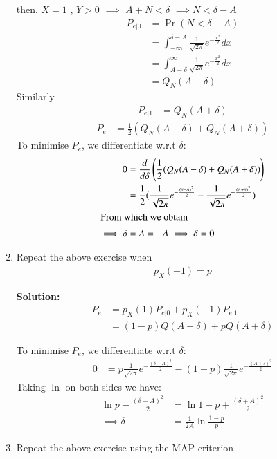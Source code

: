 \documentclass[journal,12pt,twocolumn]{IEEEtran}
\newcommand{\solution}{\noindent \textbf{Solution: }}
\providecommand{\pr}[1]{\ensuremath{\Pr\left(#1\right)}}
\numberwithin{equation}{section}
\renewcommand\thesection{\arabic{section}}
\begin{document}
\begin{enumerate}[label=\thesection.\arabic*,ref=\thesection.\theenumi]
	then, $X = 1$ , $Y > 0$ $\implies$ $A + N < \delta$ $\implies N < \delta - A$
\begin{align}
P_{e|0} &= \pr{N < \delta - A} \\
&= \int _{-\infty} ^{\delta - A} \frac{1}{\sqrt{2\pi}} e^{-\frac{x^2}{2}} dx \\
&= \int _{A - \delta} ^{\infty} \frac{1}{\sqrt{2\pi}} e^{-\frac{x^2}{2}} dx \\
&= Q_N(A - \delta) 
\end{align}
Similarly
\begin{align}
P_{e|1} &= Q_N(A+\delta) 
\end{align}
\begin{align}
P_e &= \frac{1}{2}(Q_N(A - \delta) + Q_N(A + \delta)) 
\end{align}
To minimise $P_e$, we differentiate w.r.t $\delta$:
\begin{align}
0 &= \frac{d}{d\delta} \left(\frac{1}{2}(Q_N(A - \delta) + Q_N(A + \delta))\right) \\
&= \frac{1}{2} (\frac{1}{\sqrt{2\pi}} e^{-\frac{(\delta - A)^2}{2}} - \frac{1}{\sqrt{2\pi}} e^{-\frac{(A + \delta)^2}{2}} ) \\
\intertext{From which we obtain}
\implies \delta &= A = -A
\implies \delta = 0
\end{align}
	\item Repeat the above exercise when 
	\begin{align}
		p_{X}(-1) = p
	\end{align}
	
	\solution	
	\begin{align}
		P_e &= p_X(1) P_{e|0} + p_X(-1) P_{e|1} \\
		&= (1-p) Q(A-\delta) + p Q(A+\delta) 
	\end{align}
	
To minimise $P_e$, we differentiate w.r.t $\delta$:
\begin{align}
	0 &= p \frac{1}{\sqrt{2\pi}} e^{-\frac{(\delta - A)^2}{2}} - (1-p)\frac{1}{\sqrt{2\pi}} e^{-\frac{(A + \delta)^2}{2}} 
\end{align}
 Taking $\ln$ on both sides we have:
 \begin{align}
    \ln{p} - \frac{(\delta - A)^2}{2} &= \ln{1-p} + \frac{(\delta + A)^2}{2} \\
    \implies \delta &= \frac{1}{2A} \ln{\frac{1-p}{p}}
 \end{align}
	\item Repeat the above exercise using the MAP criterion	
	

\end{enumerate}
\end{document}

